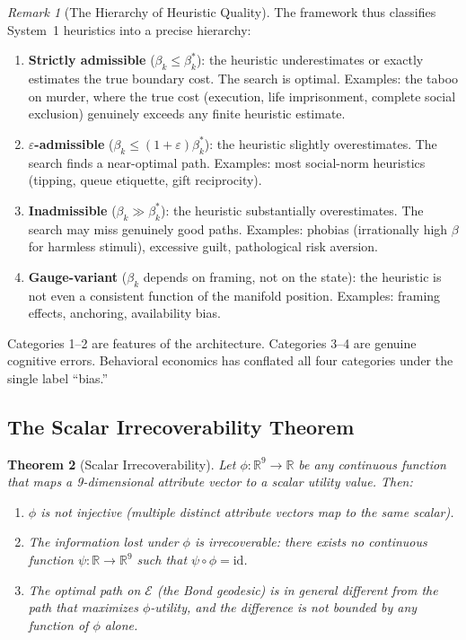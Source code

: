 \documentclass[12pt]{article}
\newtheorem{theorem}{Theorem}[section]
\theoremstyle{definition}
\theoremstyle{remark}
\newtheorem{remark}[theorem]{Remark}
\newcommand{\E}{\mathcal{E}}               %
\newcommand{\R}{\mathbb{R}}
\begin{document}
\begin{remark}[The Hierarchy of Heuristic Quality]
The framework thus classifies System~1 heuristics into a precise hierarchy:
\begin{enumerate}
    \item \textbf{Strictly admissible} ($\beta_k \leq \beta_k^*$): the heuristic underestimates or exactly estimates the true boundary cost.  The search is optimal.  Examples: the taboo on murder, where the true cost (execution, life imprisonment, complete social exclusion) genuinely exceeds any finite heuristic estimate.
    \item \textbf{$\varepsilon$-admissible} ($\beta_k \leq (1+\varepsilon)\beta_k^*$): the heuristic slightly overestimates.  The search finds a near-optimal path.  Examples: most social-norm heuristics (tipping, queue etiquette, gift reciprocity).
    \item \textbf{Inadmissible} ($\beta_k \gg \beta_k^*$): the heuristic substantially overestimates.  The search may miss genuinely good paths.  Examples: phobias (irrationally high $\beta$ for harmless stimuli), excessive guilt, pathological risk aversion.
    \item \textbf{Gauge-variant} ($\beta_k$ depends on framing, not on the state): the heuristic is not even a consistent function of the manifold position.  Examples: framing effects, anchoring, availability bias.
\end{enumerate}
Categories 1--2 are features of the architecture.  Categories 3--4 are genuine cognitive errors.  Behavioral economics has conflated all four categories under the single label ``bias.''
\end{remark}

\subsection{The Scalar Irrecoverability Theorem}

\begin{theorem}[Scalar Irrecoverability]
\label{thm:irrecoverability}
Let $\phi: \R^9 \to \R$ be any continuous function that maps a 9-dimensional attribute vector to a scalar utility value.  Then:
\begin{enumerate}
    \item $\phi$ is not injective (multiple distinct attribute vectors map to the same scalar).
    \item The information lost under $\phi$ is \emph{irrecoverable}: there exists no continuous function $\psi: \R \to \R^9$ such that $\psi \circ \phi = \text{id}$.
    \item The optimal path on $\E$ (the Bond geodesic) is in general \emph{different} from the path that maximizes $\phi$-utility, and the difference is not bounded by any function of $\phi$ alone.
\end{enumerate}
\end{theorem}
\end{document}
